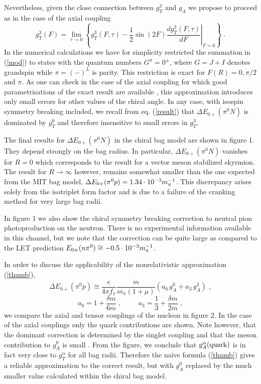 Nevertheless, given the close connection between $g_T^3$ and $g_A$
we  propose to proceed as in the case of the axial coupling
\cite{Vep}
\begin{equation}
\label{reg}
g_T^{3}(F)=\lim_{\tau\to 0} \left\{g_T^{3}(F,\tau)-\frac{1}{2}
\sin(2F)\left.\frac{dg_T^{3}(F,\tau)}{dF}\right|_{F=0}\right\} \; .
\end{equation}
In the numerical calculations we have for simplicity restricted the summation
in (\ref{mod}) to states with the quantum numbers $G^{\pi}=0^{\pm}$, where 
$G=J+I$ denotes grandspin while $\pi=(-)^{L}$ is parity. This restriction
is exact for $F(R)=0,\pi/2$ and $\pi$. As one can check in the case of the 
axial coupling for which good parametrisations of the exact result are 
available \cite{Gol}, this approximation introduces only small errors for
other values of the  chiral angle. In any case, with isospin symmetry 
breaking included, we recall from eq. (\ref{result}) that $\Delta E_{0+}
(\pi^0 N)$ is dominated by $g_T^0$ and therefore insensitive to small
errors in $g_T^3$. 

The final results for $\Delta E_{0+}(\pi^0 N)$ in the chiral bag model are 
shown in figure 1. They depend strongly on the bag radius. In particular,
$\Delta E_{0+}(\pi^0 N)$ vanishes for $R=0$ which corresponds to the result
for a vector meson stabilized skyrmion. The result for $R\to\infty$ however,
remains somewhat smaller than the one expected from the MIT bag model,
$\Delta E_{0+}(\pi^0 p)=1.34\cdot 10^{-3}m_{\pi}^{-1}$. This discrepancy arises solely from the isotriplet
form factor and is due to a failure of the cranking method for very large 
bag radii.

In figure 1 we also show the chiral symmetry breaking correction to 
neutral pion photoproduction on the neutron. There is no experimental
information available in this channel, but we note that the correction can
be quite large as compared to the LET prediction $E_{0+}(n\pi^0)\cong
-0.5\cdot 10^{-3}m_{\pi}^{-1}$.

In order to discuss the applicability of the nonrelativistic approximation
(\ref{thumb}),
\begin{equation}
\Delta E_{0+}(\pi^0 p) \cong \frac{e}{4\pi f_\pi}
 \frac{\overline{m}}{m_\pi (1+\mu)} 
  ( a_0\, g_A^0 + a_3 \, g_A^3 ) \; ,
\end{equation}
\begin{equation}
  a_0= 1+ \frac{\delta m}{6\overline{m}} \; , \hspace{1cm}
   a_3 =\frac{1}{3} +\frac{\delta m}{2\overline{m}} \; ,
\end{equation} 
 we compare the axial and tensor couplings of the nucleon
in figure 2. In the case of the axial couplings only the quark contributions
are shown. Note however, that the dominant correction is determined by
the singlet coupling and that the meson contribution to $g_A^0$ is  
small \cite{Wei}. From the figure, we conclude that $g_A^{\alpha}({\rm quark})$
is in fact very close to $g_T^{\alpha}$ for all bag radii. Therefore
the naive formula (\ref{thumb}) gives a reliable approximation to the
correct result, but with $g_A^0$  replaced by the much smaller value calculated
within the  chiral bag model. 

